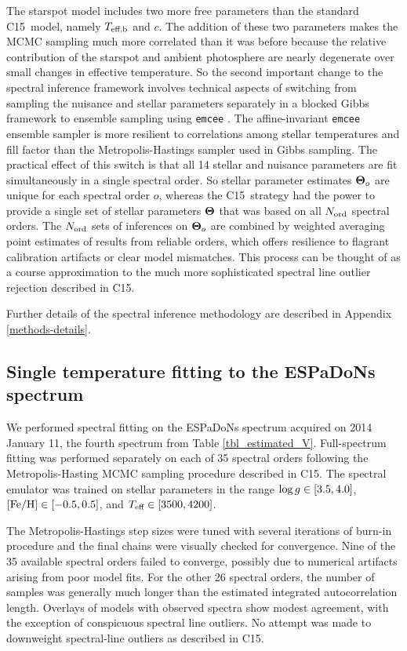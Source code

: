 \documentclass[twocolumn]{emulateapj}%
\newcommand{\iancze}{{\sc C15}}
\begin{document}
The starspot model includes two more free parameters than the standard \iancze\ model, namely $T_\textrm{eff,b}$ and $c$.  The addition of these two parameters makes the MCMC sampling much more correlated than it was before because the relative contribution of the starspot and ambient photosphere are nearly degenerate over small changes in effective temperature.  So the second important change to the spectral inference framework involves technical aspects of switching from sampling the nuisance and stellar parameters separately in a blocked Gibbs framework to ensemble sampling using \texttt{emcee} \citep{foreman13}.  The affine-invariant \texttt{emcee} ensemble sampler is more resilient to correlations among stellar temperatures and fill factor than the Metropolis-Hastings sampler used in Gibbs sampling.  The practical effect of this switch is that all 14 stellar and nuisance parameters are fit simultaneously in a single spectral order.  So stellar parameter estimates ${\bm \Theta}_{o}$ are unique for each spectral order $o$, whereas the \iancze\ strategy had the power to provide a single set of stellar parameters ${\bm \Theta}$ that was based on all $N_{\rm ord}$ spectral orders.  The $N_{\rm ord}$ sets of inferences on ${\bm \Theta}_{o}$ are combined by weighted averaging point estimates of results from reliable orders, which offers resilience to flagrant calibration artifacts or clear model mismatches.  This process can be thought of as a course approximation to the much more sophisticated spectral line outlier rejection described in \iancze.

Further details of the spectral inference methodology are described in Appendix \ref{methods-details}.


\subsection{Single temperature fitting to the ESPaDoNs spectrum}

We performed spectral fitting on the ESPaDoNs spectrum acquired on 2014 January 11, the fourth spectrum from Table \ref{tbl_estimated_V}.  Full-spectrum fitting was performed separately on each of 35 spectral orders following the Metropolis-Hasting MCMC sampling procedure described in \iancze.  The spectral emulator was trained on stellar parameters in the range $\log g \in [3.5, 4.0]$, $[{\rm Fe}/{\rm H}] \in [-0.5, 0.5]$, and $T_\textrm{eff} \in [3500, 4200]$.

The Metropolis-Hastings step sizes were tuned with several iterations of burn-in procedure and the final chains were visually checked for convergence.  Nine of the 35 available spectral orders failed to converge, possibly due to numerical artifacts arising from poor model fits.  For the other 26 spectral orders, the number of samples was generally much longer than the estimated integrated autocorrelation length.  Overlays of models with observed spectra show modest agreement, with the exception of conspicuous spectral line outliers.  No attempt was made to downweight spectral-line outliers as described in \iancze.  
\end{document}
